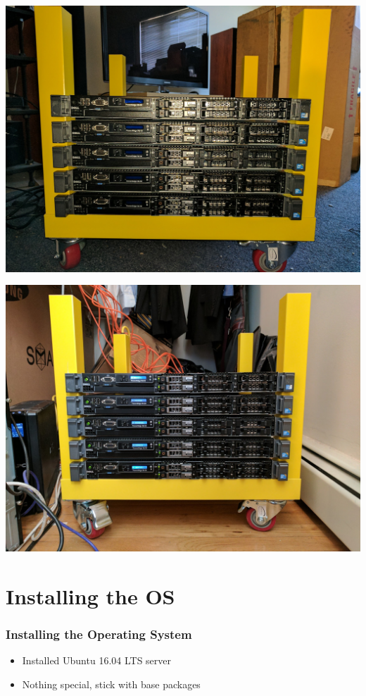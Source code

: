 \documentclass[aspectratio=169,11pt,hyperref={colorlinks=true}]{beamer}
\begin{document}
\begin{frame}
\begin{columns}[T]
\begin{column}{.48\textwidth}
        \end{column}
    \end{columns}
\end{frame}

\begin{frame}
    \centering
    \includegraphics[width=.75\textwidth]{lack_rack.jpg}
\end{frame}

\begin{frame}
    \centering
    \includegraphics[width=.9\textwidth]{data_closet.jpg}
\end{frame}

\section{Installing the OS}
\begin{frame}
    \frametitle{Installing the Operating System}
    \begin{itemize}
        \item Installed Ubuntu 16.04 LTS server
        \item Nothing special, stick with base packages
    \end{itemize}
\end{frame}
\end{document}
